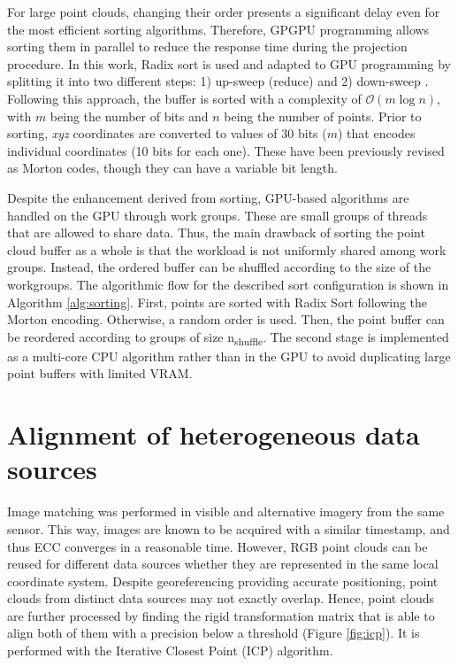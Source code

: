 For large point clouds, changing their order presents a significant delay even for the most efficient sorting algorithms. Therefore, GPGPU programming allows sorting them in parallel to reduce the response time during the projection procedure. In this work, Radix sort is used and adapted to GPU programming by splitting it into two different steps: 1) up-sweep (reduce) and 2) down-sweep \cite{nguyen_gpu_2007}. Following this approach, the buffer is sorted with a complexity of $\mathcal{O}(m\log{}n)$, with $m$ being the number of bits and $n$ being the number of points. Prior to sorting, \textit{xyz} coordinates are converted to values of 30 bits ($m$) that encodes individual coordinates (10 bits for each one). These have been previously revised as Morton codes, though they can have a variable bit length.

Despite the enhancement derived from sorting, GPU-based algorithms are handled on the GPU through work groups. These are small groups of threads that are allowed to share data. Thus, the main drawback of sorting the point cloud buffer as a whole is that the workload is not uniformly shared among work groups. Instead, the ordered buffer can be shuffled according to the size of the workgroups. The algorithmic flow for the described sort configuration is shown in Algorithm \ref{alg:sorting}. First, points are sorted with Radix Sort following the Morton encoding. Otherwise, a random order is used. Then, the point buffer can be reordered according to groups of size n\textsubscript{shuffle}. The second stage is implemented as a multi-core CPU algorithm rather than in the GPU to avoid duplicating large point buffers with limited VRAM.

\section{Alignment of heterogeneous data sources}

Image matching was performed in visible and alternative imagery from the same sensor. This way, images are known to be acquired with a similar timestamp, and thus ECC converges in a reasonable time. However, RGB point clouds can be reused for different data sources whether they are represented in the same local coordinate system. Despite georeferencing providing accurate positioning, point clouds from distinct data sources may not exactly overlap. Hence, point clouds are further processed by finding the rigid transformation matrix that is able to align both of them with a precision below a threshold (Figure \ref{fig:icp}). It is performed with the Iterative Closest Point (ICP) algorithm.


